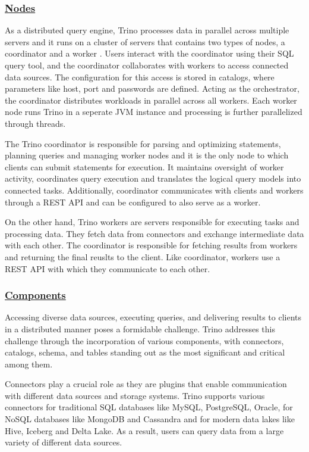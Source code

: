 \documentclass[conference]{IEEEtran}
\begin{document}
\subsubsection{\textbf{\underline{Nodes}}}
As a distributed query engine, Trino processes data in parallel across multiple servers and it runs on a cluster of servers that contains two types of nodes,
a coordinator and a worker \cite{b9} . Users interact with the coordinator using their SQL query tool, and the coordinator collaborates with workers to access connected
data sources. The configuration for this access is stored in catalogs, where parameters like host, port and passwords are defined. Acting as the orchestrator,
the coordinator distributes workloads in parallel across all workers. Each worker node runs Trino in a seperate JVM instance and processing is further parallelized through threads.

The Trino coordinator is responsible for parsing and optimizing statements, planning queries and managing worker nodes and it is the only node to which clients can submit
statements for execution. It maintains oversight of worker activity, coordinates query execution and translates the logical query models into connected tasks. Additionally,
coordinator communicates with clients and workers through a REST API and can be configured to also serve as a worker.

On the other hand, Trino workers are servers responsible for executing tasks and processing data. They fetch data from connectors and exchange intermediate data with
each other. The coordinator is responsible for fetching results from workers and returning the final reuslts to the client. Like coordinator, workers use a REST API
with which they communicate to each other.

\subsubsection{\textbf{\underline{Components}}}
Accessing diverse data sources, executing queries, and delivering results to clients in a distributed manner poses a formidable challenge. Trino addresses this challenge through
the incorporation of various components, with connectors, catalogs, schema, and tables standing out as the most significant and critical among them.

Connectors play a crucial role as they are plugins that enable communication with different data sources and storage systems.
Trino supports various connectors for traditional SQL databases like MySQL, PostgreSQL, Oracle, for NoSQL databases like MongoDB and Cassandra and for modern data lakes like
Hive, Iceberg and Delta Lake. As a result, users can query data from a large variety of different data sources.
\end{document}
